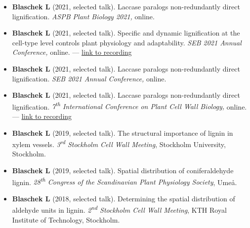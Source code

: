 \documentclass[11pt]{article}
\begin{document}
\vspace{-0.175cm}
\begin{itemize}[label={},itemindent=-9pt,leftmargin=24pt]
	\itemsep-0.1cm
	\item \textbf{Blaschek L} (2021, selected talk). Laccase paralogs non-redundantly direct lignification. \textit{ASPB Plant Biology 2021,} online.
	\item \textbf{Blaschek L} (2021, selected talk). Specific and dynamic lignification at the cell-type level controls plant physiology and adaptability. \textit{SEB 2021 Annual Conference,} online. --- \href{https://leonardblaschek.github.io/talks.html}{link to recording}
	\item \textbf{Blaschek L} (2021, selected talk). Laccase paralogs non-redundantly direct lignification. \textit{SEB 2021 Annual Conference,} online.
	\item \textbf{Blaschek L} (2021, selected talk). Laccase paralogs non-redundantly direct lignification. \textit{7\textsuperscript{th} International Conference on Plant Cell Wall Biology,} online. --- \href{https://leonardblaschek.github.io/talks.html}{link to recording}
	\item \textbf{Blaschek L} (2019, selected talk). The structural importance of lignin in xylem vessels. \textit{3\textsuperscript{rd} Stockholm Cell Wall Meeting}, Stockholm University, Stockholm.
	\item \textbf{Blaschek L} (2019, selected talk). Spatial distribution of coniferaldehyde lignin. \textit{28\textsuperscript{th} Congress of the Scandinavian Plant Physiology Society}, Umeå.
	\item \textbf{Blaschek L} (2018, selected talk). Determining the spatial distribution of aldehyde units in lignin. \textit{2\textsuperscript{nd} Stockholm Cell Wall Meeting}, KTH Royal Institute of Technology, Stockholm.
\end{itemize}
\vspace{0.3cm}
\end{document}
